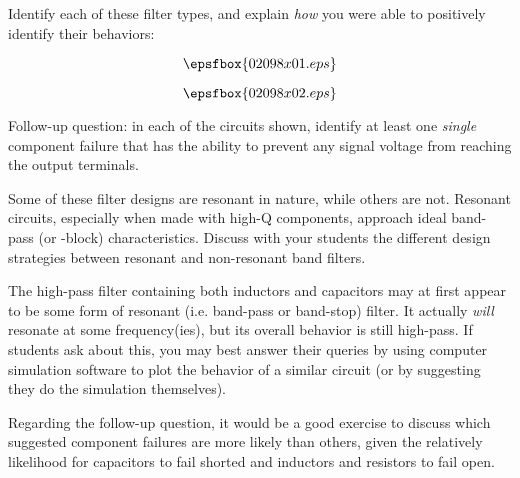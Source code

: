 

Identify each of these filter types, and explain {\it how} you were able to positively identify their behaviors:

$$\epsfbox{02098x01.eps}$$







$$\epsfbox{02098x02.eps}$$

\vskip 10pt

Follow-up question: in each of the circuits shown, identify at least one {\it single} component failure that has the ability to prevent any signal voltage from reaching the output terminals.







Some of these filter designs are resonant in nature, while others are not.  Resonant circuits, especially when made with high-Q components, approach ideal band-pass (or -block) characteristics.  Discuss with your students the different design strategies between resonant and non-resonant band filters.  

The high-pass filter containing both inductors and capacitors may at first appear to be some form of resonant (i.e. band-pass or band-stop) filter.  It actually {\it will} resonate at some frequency(ies), but its overall behavior is still high-pass.  If students ask about this, you may best answer their queries by using computer simulation software to plot the behavior of a similar circuit (or by suggesting they do the simulation themselves).

Regarding the follow-up question, it would be a good exercise to discuss which suggested component failures are more likely than others, given the relatively likelihood for capacitors to fail shorted and inductors and resistors to fail open.




